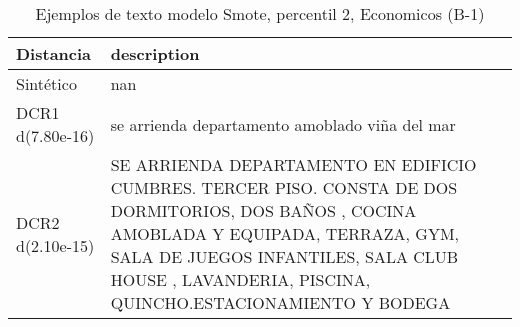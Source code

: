 \begin{table}[H]
\centering
\fontsize{10}{14}\selectfont
\caption{Ejemplos de texto modelo Smote, percentil 2, Economicos (B-1)}
\label{table-example-economicos-b-1-smote-enc-2p-text}
\begin{tabular}{|l|m{35em}|}
\hline
\rowcolor[gray]{0.8}
Distancia & description \\
\hline Sintético & nan \\
\hline DCR1 d(7.80e-16) & se  arrienda  departamento  amoblado  vi\~na del mar \\
\hline DCR2 d(2.10e-15) & SE ARRIENDA DEPARTAMENTO EN EDIFICIO CUMBRES. TERCER PISO. CONSTA DE DOS DORMITORIOS, DOS BA\~NOS , COCINA AMOBLADA Y EQUIPADA, TERRAZA, GYM, SALA DE JUEGOS INFANTILES, SALA CLUB HOUSE , LAVANDERIA, PISCINA, QUINCHO.ESTACIONAMIENTO Y BODEGA \\
\hline
\end{tabular}
\end{table}
